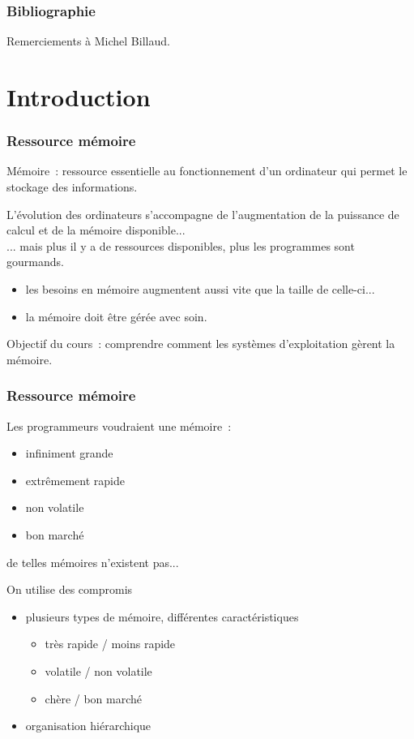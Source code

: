 \begin{frame}
\frametitle{Bibliographie}

\small
\nocite{*}    
  
\vspace{0.5cm}    
Remerciements à Michel Billaud.
\end{frame}


\section{Introduction}
\begin{frame}
\frametitle{Ressource mémoire}
\alert{Mémoire}~: ressource essentielle au fonctionnement d'un ordinateur qui permet
    le stockage des informations. \\
\vspace{0.5cm}

L'évolution des ordinateurs s'accompagne de l'augmentation de la puissance de calcul
et de la mémoire disponible... \\
... mais plus il y a de ressources disponibles, plus les programmes sont gourmands. \\
\begin{itemize}
\item les besoins en mémoire augmentent aussi vite que la taille de celle-ci...
\item[\ding{212}] la mémoire doit être gérée avec soin. \\
\end{itemize}

\vspace{0.5cm}
\alert{Objectif du cours}~: comprendre comment les systèmes d'exploitation gèrent la mémoire.  
\end{frame}


\begin{frame}
\frametitle{Ressource mémoire}
Les programmeurs voudraient une mémoire~:
\begin{itemize}
\item infiniment grande
\item extrêmement rapide
\item non volatile  
\item bon marché
\end{itemize}
 de telles mémoires n'existent pas...\\
\vspace{0.5cm}

On utilise des compromis 
\begin{itemize}
\item plusieurs types de mémoire, différentes caractéristiques
\begin{itemize}
\item très rapide / moins rapide
\item volatile / non volatile
\item chère / bon marché
\end{itemize}
\item organisation hiérarchique
\end{itemize}
\end{frame}


